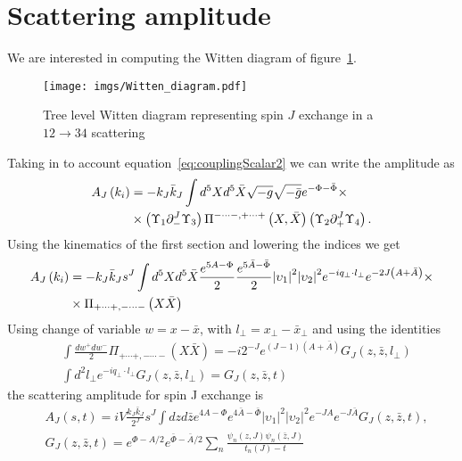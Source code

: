 \documentclass[12pt,a4paper]{article}
\begin{document}
\section{Scattering amplitude}
We are interested in computing the Witten diagram of figure~\ref{fig:Witten_diagram}.
\begin{figure}[t!]
\centering
\texttt{[image: imgs/Witten\_diagram.pdf]} 
\caption{Tree level Witten diagram representing spin $J$    exchange in a $12\to34$ scattering}
\label{fig:Witten_diagram}
\end{figure}
Taking in to account equation~\ref{eq:couplingScalar2} we can write the amplitude as
\begin{align}
    A_J \left( k_i \right) &= - k_J \bar{k}_J \int d^5 X d^5 \bar{X} \sqrt{-g} \sqrt{-\bar{g}} e^{-\Phi -\bar{\Phi}} \times \\ \notag
    & \times \left( \Upsilon_1 \partial_{-}^J \Upsilon_3 \right) \Pi^{- \cdots -, + \cdots + } \left(X, \bar{X} \right) \left( \Upsilon_2 \partial_{+}^J \Upsilon_4 \right).
\end{align}
Using the kinematics of the first section and lowering the indices we get
\begin{align}
    A_J \left( k_i \right) &= - k_J \bar{k}_J s^J \int d^5 X d^5 \bar{X} \frac{e^{5A - \Phi}}{2} \frac{e^{5\bar{A} - \bar{\Phi}}}{2} {\left| \upsilon_1 \right|}^2 {\left| \upsilon_2 \right|}^2 e^{- i q_\perp \cdot l_\perp} e^{-2 J \left( A + \bar{A} \right)} \times \\ \notag
    & \times \Pi_{+ \cdots +, - \cdots -} \left(X \bar{X}\right)
\end{align}
Using change of variable $w = x - \bar{x}$, with $l_\perp = x_\perp - \bar{x}_\perp$ and using the identities
\begin{align}
    &\int \frac{d w^+ d w^-}{2} \Pi_{+ \cdots +, - \cdots -} \left(X \bar{X}\right) = -i 2^{-J} e^{\left(J-1\right)\left(A+\bar{A}\right)} G_J \left(z, \bar{z}, l_\perp \right) \\
    &\int d^2 l_\perp e^{- i q_\perp \cdot l_\perp} G_J \left(z, \bar{z}, l_\perp \right) = G_J \left(z, \bar{z}, t \right)
\end{align}
the scattering amplitude for spin J exchange is
\begin{align}
    &A_J \left(s, t \right) = i V \frac{k_J \bar{k}_J}{2^J} s^J \int dz d\bar{z} e^{4 A - \Phi} e^{4 \bar{A} - \bar{\Phi}} {\left| \upsilon_1 \right|}^2 {\left| \upsilon_2 \right|}^2 e^{- J A} e^{- J \bar{A}} G_J \left(z, \bar{z}, t \right), \\
    & G_J \left(z, \bar{z}, t \right) = e^{\Phi - A/2} e^{\bar{\Phi} - \bar{A}/2} \sum_n \frac{\psi_n \left(z, J\right) \psi_n \left(\bar{z}, J\right)}{t_n \left(J\right) - t}
\end{align}
\end{document}
